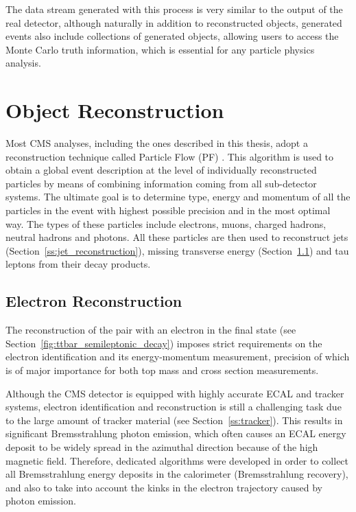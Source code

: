 The data stream generated with this process is very similar to the output of the real detector, although naturally in
addition to reconstructed objects, generated events also include collections of generated objects, allowing users to
access the Monte Carlo truth information, which is essential for any particle physics analysis.


\section{Object Reconstruction}
\label{s:object_reconstruction}
Most CMS analyses, including the ones described in this thesis, adopt a reconstruction technique called Particle Flow
(PF) \autocite{PF}. This algorithm is used to obtain a global event description at the level of individually
reconstructed particles by means of combining information coming from all sub-detector systems. The ultimate goal is to
determine type, energy and momentum of all the particles in the event with highest possible precision and in the most
optimal way. The types of these particles include electrons, muons, charged hadrons, neutral hadrons and photons. All
these particles are then used to reconstruct jets (Section~\ref{ss:jet_reconstruction}), missing transverse energy
(Section~\ref{ss:electron_reconstruction}) and tau leptons from their decay products.

\subsection{Electron Reconstruction}
\label{ss:electron_reconstruction}
The reconstruction of the \ttbar pair with an electron in the final state (see
Section~\ref{fig:ttbar_semileptonic_decay}) imposes strict requirements on the electron identification and its
energy-momentum measurement, precision of which is of major importance for both top mass and
\ttbar cross section measurements.

Although the CMS detector is equipped with highly accurate ECAL and tracker systems, electron identification and
reconstruction is still a challenging task due to the large amount of tracker material (see Section~\ref{ss:tracker}).
This results in significant Bremsstrahlung photon emission, which often causes an ECAL energy deposit to be widely
spread in the azimuthal direction because of the high magnetic field. Therefore, dedicated algorithms were developed in
order to collect all Bremsstrahlung energy deposits in the calorimeter (Bremsstrahlung recovery), and also to take into
account the kinks in the electron trajectory caused by photon emission.

